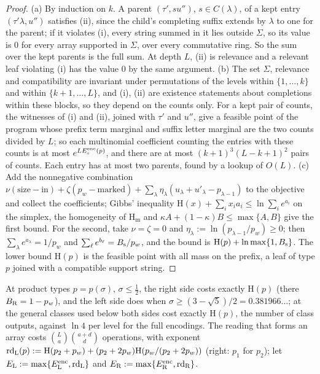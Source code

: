 \documentclass[11pt]{article}
\theoremstyle{definition}
\theoremstyle{remark}
\newcommand{\Hh}{\mathrm{H}}
\newcommand{\Hm}{\mathrm{H}_{\mathrm m}}
\begin{document}
\begin{proof}
(a) By induction on $k$. A parent $(\tau',su'')$, $s\in C(\lambda)$, of a kept entry $(\tau'\lambda,u'')$ satisfies (ii), since the child's completing suffix extends by $\lambda$ to one for the parent; if it violates (i), every string summed in it lies outside $\Sigma$, so its value is $0$ for every array supported in $\Sigma$, over every commutative ring. So the sum over the kept parents is the full sum. At depth $L$, (ii) is relevance and a relevant leaf violating (i) has the value $0$ by the same argument. (b) The set $\Sigma$, relevance and compatibility are invariant under permutations of the levels within $\{1,\dots,k\}$ and within $\{k+1,\dots,L\}$, and (i), (ii) are existence statements about completions within these blocks, so they depend on the counts only. For a kept pair of counts, the witnesses of (i) and (ii), joined with $\tau'$ and $u''$, give a feasible point of the program whose prefix term marginal and suffix letter marginal are the two counts divided by $L$; so each multinomial coefficient counting the entries with these counts is at most $e^{LE^{\rm enc}_{\rm s}(p)}$, and there are at most $(k+1)^3(L-k+1)^2$ pairs of counts. Each entry has at most two parents, found by a lookup of $O(L)$. (c) Add the nonnegative combination $\nu(\mathrm{size}-\text{in})+\zeta(p_w-\text{marked})+\sum_\lambda\eta_\lambda(u_\lambda+u'_\lambda-p_{\lambda-1})$ to the objective and collect the coefficients; Gibbs' inequality $\Hh(x)+\sum_ix_ia_i\le\ln\sum_ie^{a_i}$ on the simplex, the homogeneity of $\Hm$ and $\kappa A+(1-\kappa)B\le\max\{A,B\}$ give the first bound. For the second, take $\nu=\zeta=0$ and $\eta_\lambda:=\ln(p_{\lambda-1}/p_w)\ge0$; then $\sum_\lambda e^{a_\lambda}=1/p_w$ and $\sum_\ell e^{b_\ell}=B_{\rm s}/p_w$, and the bound is $\Hh(p)+\ln\max\{1,B_{\rm s}\}$. The lower bound $\Hh(p)$ is the feasible point with all mass on the prefix, a leaf of type $p$ joined with a compatible support string.
\end{proof}

At product types $p=p(\sigma)$, $\sigma\le\frac12$, the right side costs exactly $\Hh(p)$ (there $B_{\rm R}=1-p_w$), and the left side does when $\sigma\ge(3-\sqrt5)/2=0.381966\ldots$; at the general classes used below both sides cost exactly $\Hh(p)$, the number of class outputs, against $\ln4$ per level for the full encodings. The reading that forms an array costs $\binom La\binom{a+d}d$ operations, with exponent $\mathrm{rd}_{\rm L}(p):=\Hh(p_2+p_w)+(p_2+2p_w)\Hh(p_w/(p_2+2p_w))$ (right: $p_1$ for $p_2$); let $E_{\rm L}:=\max\{E^{\rm enc}_{\rm L},\mathrm{rd}_{\rm L}\}$ and $E_{\rm R}:=\max\{E^{\rm enc}_{\rm R},\mathrm{rd}_{\rm R}\}$.
\end{document}

